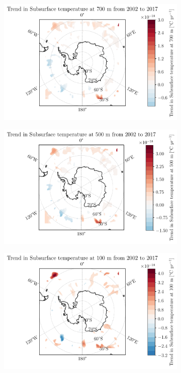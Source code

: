 \documentclass[../main.tex]{subfiles}
\begin{document}
\begin{figure}[hbt!]
    \begin{subfigure}[b]{0.3\textwidth}
    \includegraphics[width=\textwidth]{images/2021w5/chapter7/hres/trend_spatial_subsurtemp_700}
    \end{subfigure}
    \begin{subfigure}[b]{0.3\textwidth}
    \includegraphics[width=\textwidth]{images/2021w5/chapter7/hres/trend_spatial_subsurtemp_500}
    \end{subfigure}
    \begin{subfigure}[b]{0.3\textwidth}
    \includegraphics[width=\textwidth]{images/2021w5/chapter7/hres/trend_spatial_subsurtemp_100}

\end{subfigure}
\end{figure}
\end{document}
